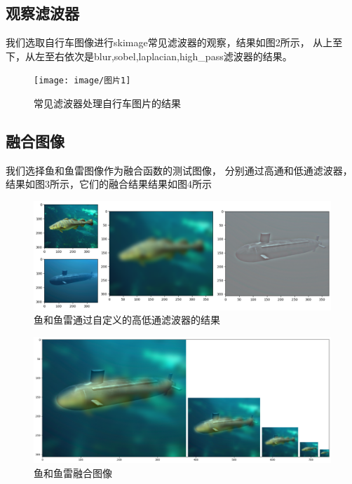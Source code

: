 \subsection{观察滤波器}
我们选取自行车图像进行skimage常见滤波器的观察，结果如图2所示，
从上至下，从左至右依次是blur,sobel,laplacian,high_pass滤波器的结果。
\begin{figure}
	\centering
	\texttt{[image: image/图片1]}
	\caption{常见滤波器处理自行车图片的结果}
	\label{图2：}
\end{figure}


\subsection{融合图像}
我们选择鱼和鱼雷图像作为融合函数的测试图像，
分别通过高通和低通滤波器，结果如图3所示，它们的融合结果结果如图4所示
\begin{figure}
	\centering
	\includegraphics[width=0.7\linewidth]{image/图片4}
	\caption{鱼和鱼雷通过自定义的高低通滤波器的结果}
	\label{图3：}
\end{figure}



\begin{figure}
	\centering
	\includegraphics[width=0.7\linewidth]{image/hybrid}
	\caption{鱼和鱼雷融合图像}
	\label{图4：}
\end{figure}

